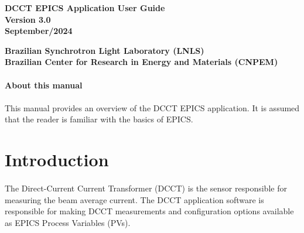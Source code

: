 \documentclass[openany]{article}
\begin{document}
\begin{titlepage}

\thispagestyle{fancy}

\begin{center}

\vspace*{\fill}
\textbf{\Huge DCCT EPICS Application User Guide}\\[20pt]
\textbf{\Huge Version 3.0}\\[20pt]
\textbf{\Huge September/2024}
\vspace*{\fill}

\vfill
\textbf{Brazilian Synchrotron Light Laboratory (LNLS)}\\[5pt]
\textbf{Brazilian Center for Research in Energy and Materials (CNPEM)}
\end{center}

\end{titlepage}

\newpage
\pagestyle{plain} %

\paragraph{}{\Large\bfseries About this manual}

\paragraph{} This manual provides an overview of the DCCT EPICS application. It is assumed that the reader is familiar with the basics of EPICS.

\tableofcontents

\newpage
\section{Introduction}

\paragraph{} The Direct-Current Current Transformer (DCCT) is the sensor responsible for measuring the beam average current. The DCCT application software is responsible for making DCCT measurements and configuration options available as EPICS Process Variables (PVs).
\end{document}
